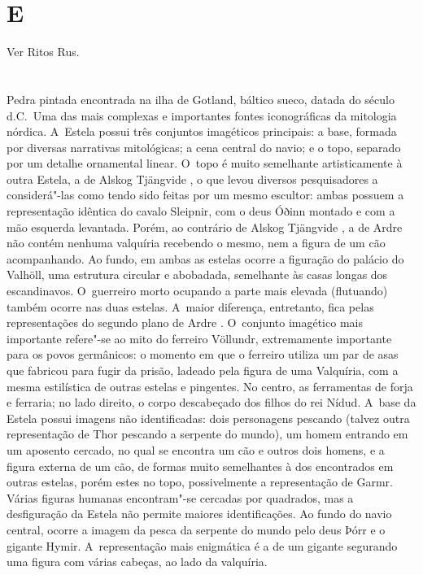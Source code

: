 \section{ E  }

Ver Ritos Rus.

\section{ }

Pedra pintada encontrada na ilha de Gotland, báltico sueco, datada do
século  d.C.~Uma das mais complexas e importantes fontes iconográficas
da mitologia nórdica. A~Estela possui três conjuntos imagéticos
principais: a base, formada por diversas narrativas mitológicas; a cena
central do navio; e o topo, separado por um detalhe ornamental linear. O~topo é muito 
semelhante artisticamente à outra Estela, a de Alskog
Tjängvide , o que levou diversos pesquisadores a considerá"-las como
tendo sido feitas por um mesmo escultor: ambas possuem a representação
idêntica do cavalo Sleipnir, com o deus Óðinn montado e com a mão
esquerda levantada. Porém, ao contrário de Alskog Tjängvide , a de
Ardre  não contém nenhuma valquíria recebendo o mesmo, nem a figura
de um cão acompanhando. Ao fundo, em ambas as estelas ocorre a figuração
do palácio do Valhöll, uma estrutura circular e abobadada, semelhante às
casas longas dos escandinavos. O~guerreiro morto ocupando a parte mais
elevada (flutuando) também ocorre nas duas estelas. A~maior diferença,
entretanto, fica pelas representações do segundo plano de Ardre . 
O~conjunto imagético mais importante refere"-se ao mito do ferreiro
Völlundr, extremamente importante para os povos germânicos: o momento em
que o ferreiro utiliza um par de asas que fabricou para fugir da prisão,
ladeado pela figura de uma Valquíria, com a mesma estilística de outras
estelas e pingentes. No centro, as ferramentas de forja e ferraria; no
lado direito, o corpo descabeçado dos filhos do rei Nídud. A~base da
Estela possui imagens não identificadas: dois personagens pescando
(talvez outra representação de Thor pescando a serpente do mundo), um
homem entrando em um aposento cercado, no qual se encontra um cão e
outros dois homens, e a figura externa de um cão, de formas muito
semelhantes à dos encontrados em outras estelas, porém estes no topo,
possivelmente a representação de Garmr. Várias figuras humanas
encontram"-se cercadas por quadrados, mas a desfiguração da Estela não
permite maiores identificações. Ao fundo do navio central, ocorre a
imagem da pesca da serpente do mundo pelo deus Þórr e o gigante Hymir. 
A~representação mais enigmática é a de um gigante segurando uma figura com
várias cabeças, ao lado da valquíria.

